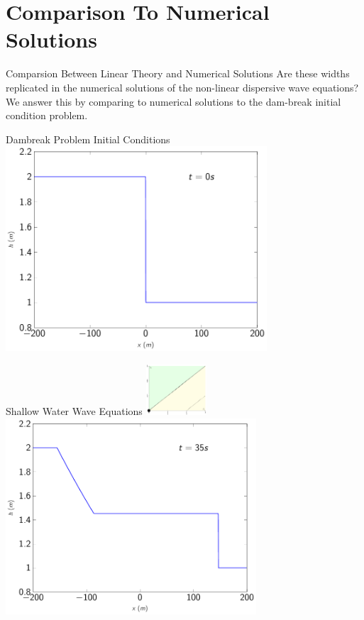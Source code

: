 \documentclass[pdf]{beamer}
\begin{document}
\section{Comparison To Numerical Solutions}
\begin{frame}{Comparsion Between Linear Theory and Numerical Solutions}
Are these widths replicated in the numerical solutions of the non-linear dispersive wave equations? \newline \newline
We answer this by comparing to numerical solutions to the dam-break initial condition problem. 
\end{frame}

\begin{frame}{Dambreak Problem Initial Conditions}
\centering
\includegraphics[width=0.73\textwidth]{./Pics/Tex/Results/DB/Init/Init.pdf}
\end{frame}

\begin{frame}{Shallow Water Wave Equations \hfill \includegraphics[width=0.17\textwidth]{./Pics/Tex/Explanatory/RegionsPlot/SPSWWE.pdf}}
\centering
\includegraphics[width=0.7\textwidth]{./Pics/Tex/Results/DB/SWWE/SWWE.pdf}
\end{frame}
\end{document}
